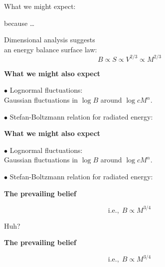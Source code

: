 {What we might expect:

\begin{center}
 because \ldots

Dimensional analysis suggests\\ 
an energy balance surface law:\\
$$ B \propto S \propto V^{2/3} \propto M^{2/3}$$
\end{center}



  \textbf{What we might also expect} 

$\bullet$  Lognormal fluctuations:\\
\quad Gaussian fluctuations in $\log{B}$ around $\log{cM^\alpha}$.



$\bullet$  Stefan-Boltzmann relation for radiated energy:\\




  \textbf{What we might also expect} 

$\bullet$  Lognormal fluctuations:\\
\quad Gaussian fluctuations in $\log{B}$ around $\log{cM^\alpha}$.

$\bullet$  Stefan-Boltzmann relation for radiated energy:\\


  \textbf{The prevailing belief}

\vspace{2mm}


$$ \mbox{i.e.,} \ \ B \propto M^{3/4}$$

 

Huh?




  \textbf{The prevailing belief}

\vspace{2mm}

$$ \mbox{i.e.,} \ \ B \propto M^{3/4}$$



}
